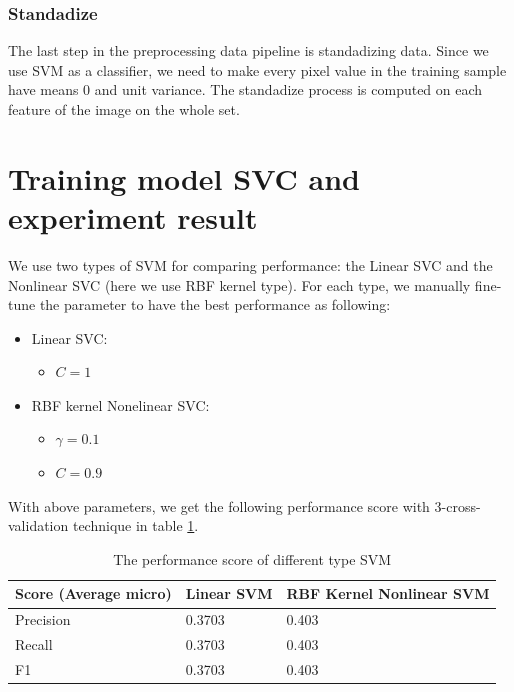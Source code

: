 \documentclass[12pt, a4paper]{article}
\begin{document}
	\subsubsection{Standadize}
	
	The last step in the preprocessing data pipeline is standadizing data. Since we use SVM as a classifier, we need to make every pixel value in the training sample have means 0 and unit variance. The standadize process is computed on each feature of the image on the whole set.
	
	\section{Training model SVC and experiment result}
	
	We use two types of SVM for comparing performance: the Linear SVC and the Nonlinear SVC (here we use RBF kernel type). For each type, we manually fine-tune the parameter to have the best performance as following:
	
	\begin{itemize}
		\item Linear SVC:
			\begin{itemize}
				\item $C = 1$
			\end{itemize}
		\item RBF kernel Nonelinear SVC:
			\begin{itemize}
				\item $\gamma = 0.1$
				\item $C = 0.9$ 
			\end{itemize}
	\end{itemize}
	
	With above parameters, we get the following performance score with 3-cross-validation technique in table \ref{tab:performance_score}.
	
	\begin{table}[]
	\centering 
	\begin{tabular}{@{}lll@{}}
	\toprule
	\textbf{Score (Average micro)} & \textbf{Linear SVM} & \textbf{RBF Kernel Nonlinear SVM} \\ \midrule
	Precision & 0.3703 & 0.403 \\
	Recall    & 0.3703 & 0.403 \\
	F1        & 0.3703 & 0.403 \\ \bottomrule
	\end{tabular}
	\caption{The performance score of different type SVM}
	\label{tab:performance_score}
	\end{table}
	
\end{document}
